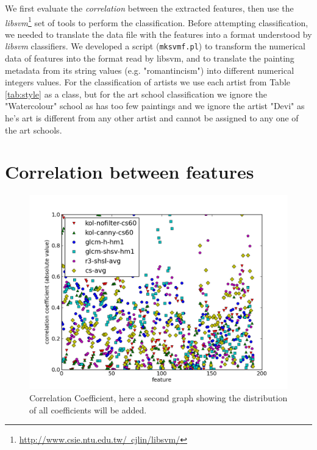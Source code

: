 \documentclass[11pt,a4paper,twoside,openright]{report}
\begin{document}
We first evaluate the \emph{correlation} between the extracted features, then
use the \emph{libsvm}\footnote{\href{http://www.csie.ntu.edu.tw/~cjlin/libsvm/}
{http://www.csie.ntu.edu.tw/~cjlin/libsvm/}} set of tools to perform the
classification.  Before attempting classification, we needed to translate the
data file with the features into a format understood by \emph{libsvm}
classifiers.  We developed a script (\texttt{mksvmf.pl}) to transform the
numerical data of features into the format read by libsvm, and to translate the
painting metadata from its string values (e.g. "romantincism") into different
numerical integers values.  For the classification of artists we use each
artist from Table \ref{tab:style} as a class, but for the art school
classification we ignore the "Watercolour" school as has too few paintings and
we ignore the artist "Devi" as he's art is different from any other artist and
cannot be assigned to any one of the art schools.




\section{Correlation between features}

\begin{figure}[tbp]
\centering
\includegraphics[width=\textwidth]{corr-graph}
\caption[Correlation]{Correlation Coefficient, here a second graph showing the
distribution of all coefficients will be added.}
\label{fig:corr}
\end{figure}
\end{document}
